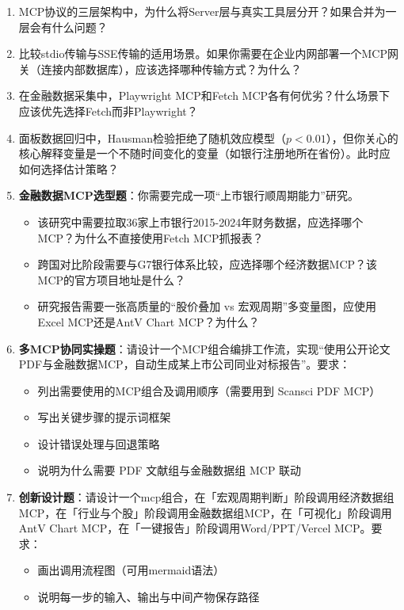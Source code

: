 \begin{exercisebox}[思考题]
\begin{enumerate}[leftmargin=2em]
  \item MCP协议的三层架构中，为什么将Server层与真实工具层分开？如果合并为一层会有什么问题？
  \item 比较stdio传输与SSE传输的适用场景。如果你需要在企业内网部署一个MCP网关（连接内部数据库），应该选择哪种传输方式？为什么？
  \item 在金融数据采集中，Playwright MCP和Fetch MCP各有何优劣？什么场景下应该优先选择Fetch而非Playwright？
  \item 面板数据回归中，Hausman检验拒绝了随机效应模型（$p < 0.01$），但你关心的核心解释变量是一个不随时间变化的变量（如银行注册地所在省份）。此时应如何选择估计策略？
  \item \textbf{金融数据MCP选型题}：你需要完成一项“上市银行顺周期能力”研究。
  \begin{itemize}
    \item 该研究中需要拉取36家上市银行2015-2024年财务数据，应选择哪个MCP？为什么不直接使用Fetch MCP抓报表？
    \item 跨国对比阶段需要与G7银行体系比较，应选择哪个经济数据MCP？该MCP的官方项目地址是什么？
    \item 研究报告需要一张高质量的“股价叠加 vs 宏观周期”多变量图，应使用Excel MCP还是AntV Chart MCP？为什么？
  \end{itemize}
  \item \textbf{多MCP协同实操题}：请设计一个MCP组合编排工作流，实现“使用公开论文PDF与金融数据MCP，自动生成某上市公司同业对标报告”。要求：
  \begin{itemize}
    \item 列出需要使用的MCP组合及调用顺序（需要用到 Scansci PDF MCP）
    \item 写出关键步骤的提示词框架
    \item 设计错误处理与回退策略
    \item 说明为什么需要 PDF 文献组与金融数据组 MCP 联动
  \end{itemize}
  \item \textbf{创新设计题}：请设计一个mcp组合，在「宏观周期判断」阶段调用经济数据组MCP，在「行业与个股」阶段调用金融数据组MCP，在「可视化」阶段调用AntV Chart MCP，在「一键报告」阶段调用Word/PPT/Vercel MCP。要求：
  \begin{itemize}
    \item 画出调用流程图（可用mermaid语法）
    \item 说明每一步的输入、输出与中间产物保存路径
  \end{itemize}
\end{enumerate}
\end{exercisebox}

